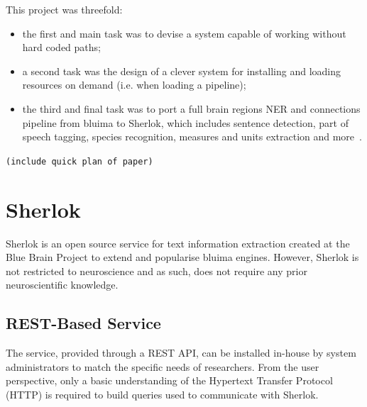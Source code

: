 \documentclass{article}
\newcommand{\TODO}[1]{\texttt{\textcolor{YellowOrange}{(#1)}}} %
\newcommand{\REST}[1]{\textsf{#1}}
\newcommand{\MULTIROW}[2]{\multirow{#1}{*}{\vbox{#2}}}
\begin{document}
This project was threefold:

\begin{itemize}[label=]
    \item the first and main task was to devise a system capable of working without hard coded
        paths;
    \item a second task was the design of a clever system for installing and loading resources on
        demand (i.e. when loading a pipeline);
    \item the third and final task was to port a full brain regions NER and connections pipeline
        from bluima to Sherlok, which includes sentence detection, part of speech tagging, species
        recognition, measures and units extraction and more~\cite{bluima_2013}.
\end{itemize}

\TODO{include quick plan of paper}

\section{Sherlok}

Sherlok is an open source service for text information extraction created at the Blue Brain Project
to extend and popularise bluima engines. However, Sherlok is not restricted to neuroscience and as
such, does not require any prior neuroscientific knowledge.

\subsection{REST-Based Service}

The service, provided through a REST API, can be installed in-house by system administrators to
match the specific needs of researchers. From the user perspective, only a basic understanding of
the Hypertext Transfer Protocol (HTTP) is required to build queries used to communicate with
Sherlok.



\end{document}
